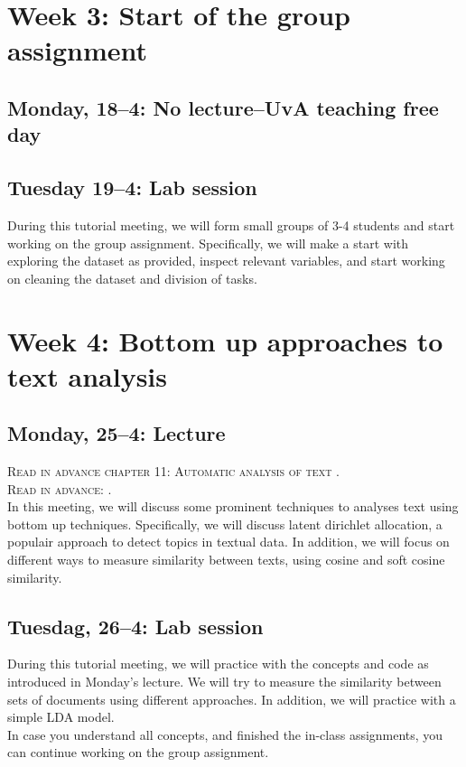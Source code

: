 {\section*{Week 3: Start of the group assignment}

\subsection*{Monday, 18--4: No lecture--UvA teaching free day}

\subsection*{Tuesday 19--4: Lab session}
During this tutorial meeting, we will form small groups of 3-4 students and start working on the group assignment. Specifically, we will make a start with exploring the dataset as provided, inspect relevant variables, and start working on cleaning the dataset and division of tasks. 

\section*{Week 4: Bottom up approaches to text analysis}

\subsection*{Monday, 25--4: Lecture}
\textsc{Read in advance chapter 11: Automatic analysis of text \cite{van2021computational}.} \\
\textsc{Read in advance: \cite{Brinberg2021}.} \\

In this meeting, we will discuss some prominent techniques to analyses text using bottom up techniques. Specifically, we will discuss latent dirichlet allocation, a populair approach to detect topics in textual data. In addition, we will focus on different ways to measure similarity between texts, using cosine and soft cosine similarity. 

\subsection*{Tuesdag, 26--4: Lab session}
During this tutorial meeting, we will practice with the concepts and code as introduced in Monday's lecture. We will try to measure the similarity between sets of documents using different approaches. In addition, we will practice with a simple LDA model. \\
In case you understand all concepts, and finished the in-class assignments, you can continue working on the group assignment. 

}
